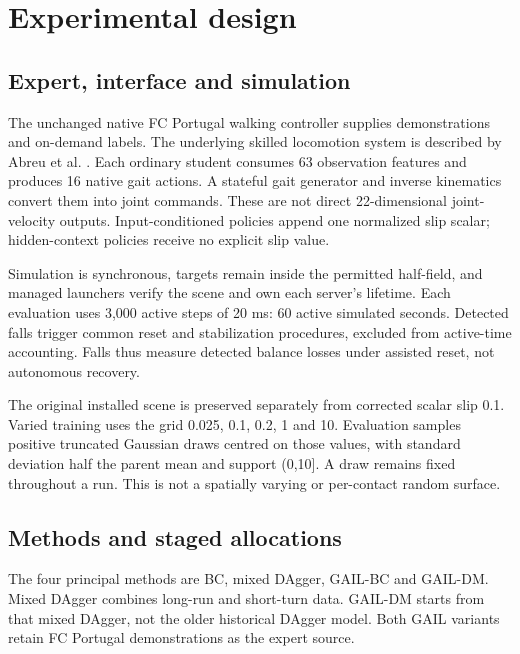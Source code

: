 \documentclass[conference]{IEEEtran}
\begin{document}
\section{Experimental design}

\subsection{Expert, interface and simulation}

The unchanged native FC Portugal walking controller supplies demonstrations and on-demand labels. The underlying skilled locomotion system is described by Abreu et al. \citep{abreu2025}. Each ordinary student consumes 63 observation features and produces 16 native gait actions. A stateful gait generator and inverse kinematics convert them into joint commands. These are not direct 22-dimensional joint-velocity outputs. Input-conditioned policies append one normalized slip scalar; hidden-context policies receive no explicit slip value.

Simulation is synchronous, targets remain inside the permitted half-field, and managed launchers verify the scene and own each server's lifetime. Each evaluation uses 3,000 active steps of 20 ms: 60 active simulated seconds. Detected falls trigger common reset and stabilization procedures, excluded from active-time accounting. Falls thus measure detected balance losses under assisted reset, not autonomous recovery.

The original installed scene is preserved separately from corrected scalar slip 0.1. Varied training uses the grid 0.025, 0.1, 0.2, 1 and 10. Evaluation samples positive truncated Gaussian draws centred on those values, with standard deviation half the parent mean and support (0,10]. A draw remains fixed throughout a run. This is not a spatially varying or per-contact random surface.

\subsection{Methods and staged allocations}

The four principal methods are BC, mixed DAgger, GAIL-BC and GAIL-DM. Mixed DAgger combines long-run and short-turn data. GAIL-DM starts from that mixed DAgger, not the older historical DAgger model. Both GAIL variants retain FC Portugal demonstrations as the expert source.
\end{document}
